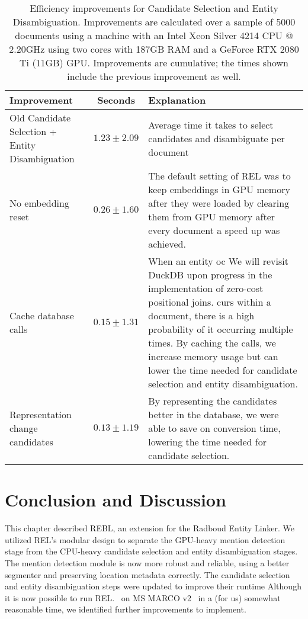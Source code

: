 \begin{sidewaystable}
	\caption{Efficiency improvements for Candidate Selection and Entity Disambiguation. Improvements are calculated over a sample of 5000 documents using a machine with an Intel Xeon Silver 4214 CPU @ 2.20GHz using two cores with 187GB RAM and a GeForce RTX 2080 Ti (11GB) GPU. Improvements are cumulative; the times shown include the previous improvement as well.}
	\label{tab:efficiency}
	\begin{tabular}{p{6cm} c p{10cm}}
		\toprule
		Improvement & Seconds & Explanation\\
		\midrule
		Old Candidate Selection + Entity Disambiguation & $1.23 \pm 2.09$ & Average time it takes to select candidates and disambiguate per document\\
		\midrule
		No embedding reset & $0.26 \pm 1.60$ & The default setting of REL was to keep embeddings in GPU memory after they were loaded by clearing them from GPU memory after every document a speed up was achieved.\\
		Cache database calls & $0.15 \pm 1.31$ & When an entity oc We will revisit DuckDB upon progress in the implementation of zero-cost positional joins.  curs within a document, there is a high probability of it occurring multiple times. By caching the calls, we increase memory usage but can lower the time needed for candidate selection and entity disambiguation.  \\
		Representation change candidates & $0.13 \pm 1.19$ & By representing the candidates better in the database, we were able to save on conversion time, lowering the time needed for candidate selection.\\
		\bottomrule
	\end{tabular}
\end{sidewaystable}

\section{Conclusion and Discussion}
This chapter described REBL, an extension for the Radboud Entity Linker. We utilized REL's modular design to separate the GPU-heavy mention detection stage from the CPU-heavy candidate selection and entity disambiguation stages. The mention detection module is now more robust and reliable, using a better segmenter and preserving location metadata correctly.
The candidate selection and entity disambiguation steps were updated to improve their runtime Although it is now possible to run REL.~\citep{rel} on MS MARCO v2~\citep{msmarco} in a (for us) somewhat reasonable time, we identified further improvements to implement.

